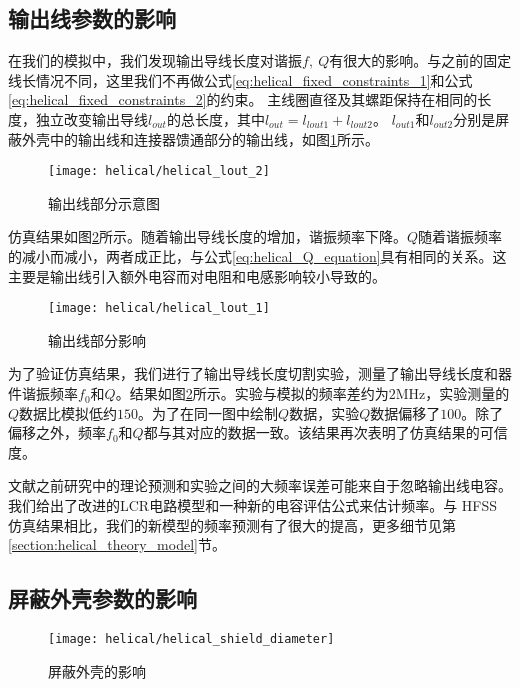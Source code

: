 \subsection[输出线参数的影响]{输出线参数的影响\label{section:helical_output_wire}}
在我们的模拟中，我们发现输出导线长度对谐振$f,\ Q$有很大的影响。与之前的固定线长情况不同，这里我们不再做公式\eqref{eq:helical_fixed_constraints_1}和公式\eqref{eq:helical_fixed_constraints_2}的约束。
主线圈直径及其螺距保持在相同的长度，独立改变输出导线$l_{out}$的总长度，其中$l_{out} = l_{lout1} + l_{lout2}$。
$l_{out1}$和$l_{out2}$分别是屏蔽外壳中的输出线和连接器馈通部分的输出线，如图\ref{fig:helical_lout_2}所示。


\begin{figure}
    \centering
    \caption[输出线部分示意图]{输出线部分示意图\label{fig:helical_lout_2}}
    \texttt{[image: helical/helical\_lout\_2]}
\end{figure}

仿真结果如图\ref{fig:helical_lout_1}所示。随着输出导线长度的增加，谐振频率下降。$Q$随着谐振频率的减小而减小，两者成正比，与公式\eqref{eq:helical_Q_equation}具有相同的关系。这主要是输出线引入额外电容而对电阻和电感影响较小导致的。

\begin{figure}
    \centering
    \caption[输出线部分影响]{输出线部分影响\label{fig:helical_lout_1}}
    \texttt{[image: helical/helical\_lout\_1]}
\end{figure}

为了验证仿真结果，我们进行了输出导线长度切割实验，测量了输出导线长度和器件谐振频率$f_0$和$Q$。结果如图\ref{fig:helical_lout_1}所示。实验与模拟的频率差约为$2$MHz，实验测量的$Q$数据比模拟低约$150$。为了在同一图中绘制$ Q $数据，实验$ Q $数据偏移了$ 100$。除了偏移之外，频率$f_0$和$ Q $都与其对应的数据一致。该结果再次表明了仿真结果的可信度。

文献\cite[]{Gandolfi_Niedermayr_Kumph_Brownnutt_Blatt_2012,Macalpine_Schildknecht_1959, Deng_Sun_Yuan_Xu_Zhang_Lu_Luo_2014}之前研究中的理论预测和实验之间的大频率误差可能来自于忽略输出线电容\cite[]{Nandi_Sikdar_Das_Ray_2022, Batra_Panja_De_Roy_Majhi_Yadav_Sen_Gupta_2017}。我们给出了改进的LCR电路模型和一种新的电容评估公式来估计频率。与 HFSS 仿真结果相比，我们的新模型的频率预测有了很大的提高，更多细节见第\ref{section:helical_theory_model}节。

\subsection[屏蔽外壳参数的影响]{屏蔽外壳参数的影响}
\begin{figure}
    \centering
    \caption[屏蔽外壳的影响]{屏蔽外壳的影响\label{fig:helical_shield_diameter}}
    \texttt{[image: helical/helical\_shield\_diameter]}
\end{figure}

